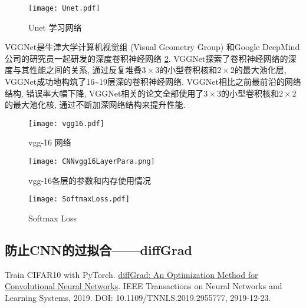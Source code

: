 \begin{figure}[H]
    \centering
    \texttt{[image: Unet.pdf]}
    \caption{Unet 学习网络}
    \label{CNNUnet0203}
    \vspace{-0.4cm}
\end{figure}
VGGNet是牛津大学计算机视觉组 (Visual Geometry Group) 和Google DeepMind公司的研究员一起研发的深度卷积神经网络 \ref{CNNvgg16020301}.
VGGNet探索了卷积神经网络的深度与其性能之间的关系, 通过反复堆叠$3\times 3$的小型卷积核和$2\times 2$的最大池化层,
VGGNet成功地构筑了16\textasciitilde 19层深的卷积神经网络.
VGGNet相比之前最前沿的网络结构, 错误率大幅下降,
VGGNet相关的论文全部使用了$3\times 3$的小型卷积核和$2\times 2$的最大池化核, 通过不断加深网络结构来提升性能.
\begin{figure}[H]
    \centering
    \texttt{[image: vgg16.pdf]}
    \caption{vgg-16 网络}
    \label{CNNvgg16020301}\vspace{-0.4cm}
\end{figure}
\begin{figure}[H]
    \centering
    \texttt{[image: CNNvgg16LayerPara.png]}
    \caption{vgg-16各层的参数和内存使用情况}
    \label{CNNvgg16LayerPara020302}
    \vspace{-0.4cm}
\end{figure}
\begin{figure}[H]
    \centering
    \texttt{[image: SoftmaxLoss.pdf]}
    \caption{Softmax Loss}
    \label{CNNSoftmaxLoss0203}
    \vspace{-0.4cm}
\end{figure}
\subsection{防止CNN的过拟合——diffGrad}
Train CIFAR10 with PyTorch. \href{https://ieeexplore.ieee.org/document/8939562}{diffGrad: An Optimization Method for Convolutional Neural Networks}. IEEE Transactions on Neural Networks and Learning Systems, 2019.
DOI: 10.1109/TNNLS.2019.2955777, 2919-12-23.

